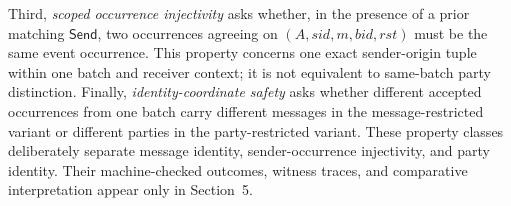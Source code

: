 Third, \emph{scoped occurrence injectivity} asks whether, in the presence of
a prior matching \(\mathsf{Send}\), two \receiveraccept occurrences agreeing
on \((A,\mathit{sid},m,\mathit{bid},\mathit{rst})\) must be the same event
occurrence. This property concerns one exact sender-origin tuple within one
batch and receiver context; it is not equivalent to same-batch party distinction.
Finally, \emph{identity-coordinate safety} asks whether different accepted
occurrences from one batch carry different messages in the message-restricted
variant or different parties in the party-restricted variant. These property
classes deliberately separate message identity, sender-occurrence
injectivity, and party identity. Their machine-checked outcomes, witness
traces, and comparative interpretation appear only in Section~5.
